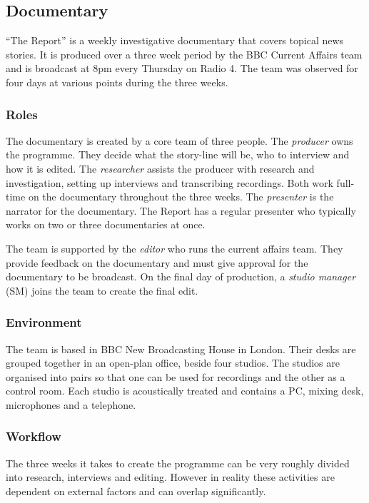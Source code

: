 \subsection{Documentary}\label{sec:doc}
``The Report'' is a weekly investigative documentary that covers topical news stories. It is produced over a three week
period by the BBC Current Affairs team and is broadcast at 8pm every Thursday on Radio 4. The team was observed for
four days at various points during the three weeks.

\subsubsection{Roles}
The documentary is created by a core team of three people. The \textit{producer} owns the programme. They decide what
the story-line will be, who to interview and how it is edited. The \textit{researcher} assists the producer with
research and investigation, setting up interviews and transcribing recordings.  Both work full-time on the documentary
throughout the three weeks.  The \textit{presenter} is the narrator for the documentary.  The Report has a regular
presenter who typically works on two or three documentaries at once.

The team is supported by the \textit{editor} who runs the current affairs team.  They provide feedback on the
documentary and must give approval for the documentary to be broadcast. On the final day of production, a
\textit{studio manager} (SM) joins the team to create the final edit.

\subsubsection{Environment}
The team is based in BBC New Broadcasting House in London. Their desks are grouped together in an open-plan office,
beside four studios. The studios are organised into pairs so that one can be used for recordings and the other as a
control room. Each studio is acoustically treated and contains a PC, mixing desk, microphones and a telephone.

\subsubsection{Workflow}
The three weeks it takes to create the programme can be very roughly divided into research, interviews and editing.
However in reality these activities are dependent on external factors and can overlap significantly.


